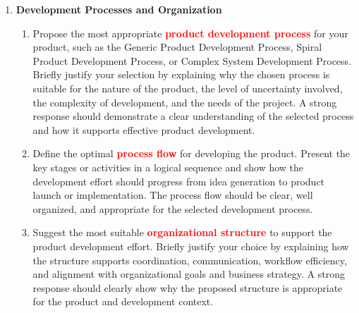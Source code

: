 \begin{enumerate}
    \item \textbf{Development Processes and Organization}
    \begin{enumerate}
        \item Propose the most appropriate \textbf{\textcolor{red}{product development process}} for your product, such as the Generic Product Development Process, Spiral Product Development Process, or Complex System Development Process. Briefly justify your selection by explaining why the chosen process is suitable for the nature of the product, the level of uncertainty involved, the complexity of development, and the needs of the project. A strong response should demonstrate a clear understanding of the selected process and how it supports effective product development.
        \item Define the optimal \textbf{\textcolor{red}{process flow}} for developing the product. Present the key stages or activities in a logical sequence and show how the development effort should progress from idea generation to product launch or implementation. The process flow should be clear, well organized, and appropriate for the selected development process.
        \item Suggest the most suitable \textbf{\textcolor{red}{organizational structure}} to support the product development effort. Briefly justify your choice by explaining how the structure supports coordination, communication, workflow efficiency, and alignment with organizational goals and business strategy. A strong response should clearly show why the proposed structure is appropriate for the product and development context.
    \end{enumerate}
    
    
   

\end{enumerate}

